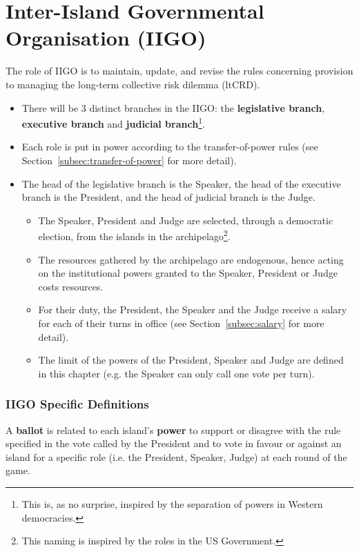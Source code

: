 \chapter{Inter-Island Governmental Organisation (IIGO)}


The role of IIGO is to maintain, update, and revise the rules concerning provision to managing the long-term collective risk dilemma (ltCRD).

\begin{itemize}
    \item There will be 3 distinct branches in the IIGO: the \textbf{legislative branch}, \textbf{executive branch} and \textbf{judicial branch}\footnote{This is, as no surprise, inspired by the separation of powers in Western democracies.}.
    \item Each role is put in power according to the  transfer-of-power rules (see Section~\ref{subsec:transfer-of-power} for more detail).
    \item The head of the legislative branch is the Speaker, the head of the executive branch is the President, and the head of judicial branch is the Judge.
    \begin{itemize}
        \item  The Speaker, President and Judge are selected, through a democratic election, from the islands in the archipelago\footnote{This naming is inspired by the roles in the US Government.}.
        \item The resources gathered by the archipelago are endogenous, hence acting on the institutional powers granted to the Speaker, President or Judge costs resources.
        \item For their duty, the President, the Speaker and the Judge receive a salary for each of their turns in office (see Section~\ref{subsec:salary} for more detail).
        \item The limit of the powers of the President, Speaker and Judge are defined in this chapter (e.g. the Speaker can only call one vote per turn).

    \end{itemize}
\end{itemize}

\subsection{IIGO Specific Definitions}
\begin{definition} \label{def:ballot}
    A \textbf{ballot} is related to each island's \textbf{power} to support or disagree with the rule specified in the vote called by the President and to vote in favour or against an island for a specific role (i.e. the President, Speaker, Judge) at each round of the game.
\end{definition}


